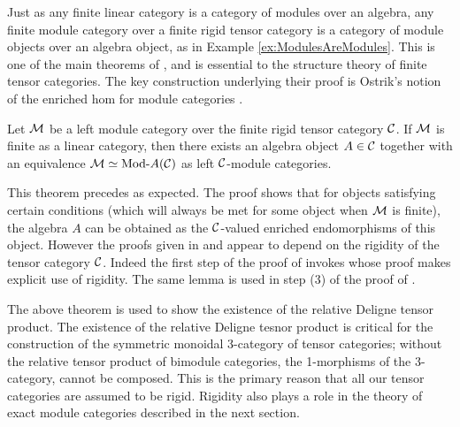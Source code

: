 \documentclass{amsart}
\begin{document}

Just as any finite linear category is a category of modules over an algebra, any finite module category over a finite rigid tensor category is a category of module objects over an algebra object, as in Example \ref{ex:ModulesAreModules}.  This is one of the main theorems of \cite{EGNO}, and is essential to the structure theory of finite tensor categories.  The key construction underlying their proof is Ostrik's notion of the enriched hom for module categories \cite{MR1976459}.

\begin{theorem} \label{thm:EGNO2.11.6} %
	Let $\mathcal M$ be a left module category over the finite rigid tensor category $\mathcal C$. If $\mathcal M$ is finite as a linear category, then there exists an algebra object $A \in \mathcal C$ together with an equivalence $\cM \simeq \Mod{}{A} (\cC)$ as left $\mathcal C$-module categories. 
\end{theorem}

This theorem precedes as expected. The proof shows that for objects satisfying certain conditions (which will always be met for some object when $\mathcal M$ is finite), the algebra $A$ can be obtained as the $\mathcal C$-valued enriched endomorphisms of this object. However the proofs given in \cite{EGNO} and \cite{MR1976459} appear to depend on  the rigidity of the tensor category $\mathcal C$. Indeed the first step of the proof of \cite[Thm 2.11.2]{EGNO} invokes \cite[lemma 2.10.4.(4)]{EGNO} whose proof makes explicit use of rigidity. The same lemma is used in step (3) of the proof of \cite[Thm 1]{MR1976459}. 

The above theorem is used to show the existence of the relative Deligne tensor product. The existence of the relative Deligne tesnor product is critical for the construction of the symmetric monoidal 3-category of tensor categories; without the relative tensor product of bimodule categories, the 1-morphisms of the 3-category, cannot be composed. This is the primary reason that all our tensor categories are assumed to be rigid. Rigidity also plays a role in the theory of exact module categories described in the next section.  
\end{document}
